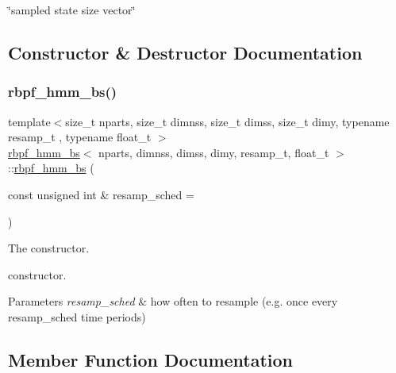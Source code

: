 \char`\"{}sampled state size vector\char`\"{} 

\subsection{Constructor \& Destructor Documentation}
\mbox{\label{classrbpf__hmm__bs_ac01f1c423a77af0aaecbddfcaa771f36}} 
\subsubsection{\texorpdfstring{rbpf\+\_\+hmm\+\_\+bs()}{rbpf\_hmm\_bs()}}
{\footnotesize\ttfamily template$<$size\+\_\+t nparts, size\+\_\+t dimnss, size\+\_\+t dimss, size\+\_\+t dimy, typename resamp\+\_\+t , typename float\+\_\+t $>$ \\
\hyperlink{classrbpf__hmm__bs}{rbpf\+\_\+hmm\+\_\+bs}$<$ nparts, dimnss, dimss, dimy, resamp\+\_\+t, float\+\_\+t $>$\+::\hyperlink{classrbpf__hmm__bs}{rbpf\+\_\+hmm\+\_\+bs} (\begin{DoxyParamCaption}\item[{const unsigned int \&}]{resamp\+\_\+sched = {} }\end{DoxyParamCaption})}



The constructor. 

constructor. 
\begin{DoxyParams}{Parameters}
{\em resamp\+\_\+sched} & how often to resample (e.\+g. once every resamp\+\_\+sched time periods) \\
\hline
\end{DoxyParams}


\subsection{Member Function Documentation}
\mbox{\label{classrbpf__hmm__bs_aebadcd5b921f3523d32f7b3cce75f5ba}} 
